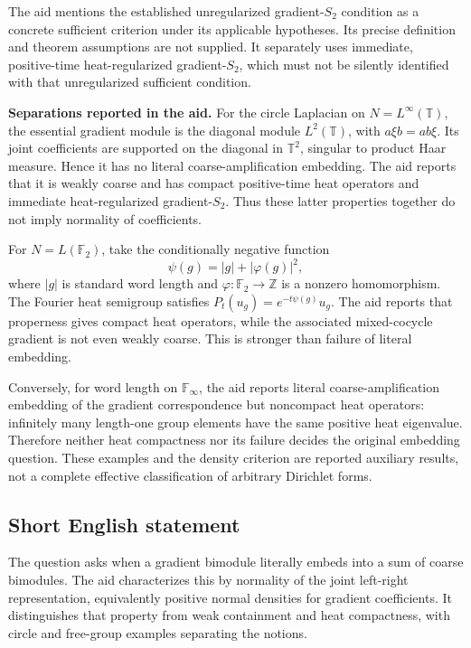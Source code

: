 \documentclass[11pt]{article}
\newcommand{\Z}{\mathbb{Z}}
\begin{document}
The aid mentions the established unregularized gradient-\(S_2\) condition as a concrete sufficient criterion under its applicable hypotheses. Its precise definition and theorem assumptions are not supplied. It separately uses immediate, positive-time heat-regularized gradient-\(S_2\), which must not be silently identified with that unregularized sufficient condition.

\textbf{Separations reported in the aid.} For the circle Laplacian on \(N=L^\infty(\mathbb T)\), the essential gradient module is the diagonal module \(L^2(\mathbb T)\), with \(a\xi b=ab\xi\). Its joint coefficients are supported on the diagonal in \(\mathbb T^2\), singular to product Haar measure. Hence it has no literal coarse-amplification embedding. The aid reports that it is weakly coarse and has compact positive-time heat operators and immediate heat-regularized gradient-\(S_2\). Thus these latter properties together do not imply normality of coefficients.

For \(N=L(\mathbb F_2)\), take the conditionally negative function
\[
 \psi(g)=|g|+|\varphi(g)|^2,
\]
where \(|g|\) is standard word length and \(\varphi:\mathbb F_2\to\Z\) is a nonzero homomorphism. The Fourier heat semigroup satisfies \(P_t(u_g)=e^{-t\psi(g)}u_g\). The aid reports that properness gives compact heat operators, while the associated mixed-cocycle gradient is not even weakly coarse. This is stronger than failure of literal embedding.

Conversely, for word length on \(\mathbb F_\infty\), the aid reports literal coarse-amplification embedding of the gradient correspondence but noncompact heat operators: infinitely many length-one group elements have the same positive heat eigenvalue. Therefore neither heat compactness nor its failure decides the original embedding question. These examples and the density criterion are reported auxiliary results, not a complete effective classification of arbitrary Dirichlet forms.
\subsection{Short English statement}
The question asks when a gradient bimodule literally embeds into a sum of coarse bimodules. The aid characterizes this by normality of the joint left-right representation, equivalently positive normal densities for gradient coefficients. It distinguishes that property from weak containment and heat compactness, with circle and free-group examples separating the notions.
\end{document}
